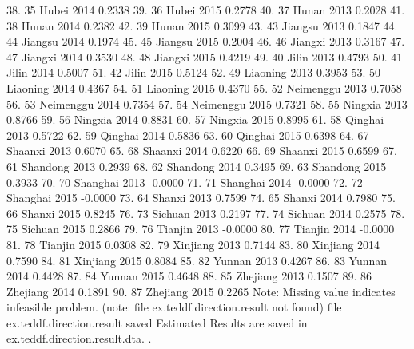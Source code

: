  38. {\VBAR}  35          Hubei   2014    0.2338 {\VBAR}
 39. {\VBAR}  36          Hubei   2015    0.2778 {\VBAR}
 40. {\VBAR}  37          Hunan   2013    0.2028 {\VBAR}
 41. {\VBAR}  38          Hunan   2014    0.2382 {\VBAR}
 42. {\VBAR}  39          Hunan   2015    0.3099 {\VBAR}
 43. {\VBAR}  43        Jiangsu   2013    0.1847 {\VBAR}
 44. {\VBAR}  44        Jiangsu   2014    0.1974 {\VBAR}
 45. {\VBAR}  45        Jiangsu   2015    0.2004 {\VBAR}
 46. {\VBAR}  46        Jiangxi   2013    0.3167 {\VBAR}
 47. {\VBAR}  47        Jiangxi   2014    0.3530 {\VBAR}
 48. {\VBAR}  48        Jiangxi   2015    0.4219 {\VBAR}
 49. {\VBAR}  40          Jilin   2013    0.4793 {\VBAR}
 50. {\VBAR}  41          Jilin   2014    0.5007 {\VBAR}
 51. {\VBAR}  42          Jilin   2015    0.5124 {\VBAR}
 52. {\VBAR}  49       Liaoning   2013    0.3953 {\VBAR}
 53. {\VBAR}  50       Liaoning   2014    0.4367 {\VBAR}
 54. {\VBAR}  51       Liaoning   2015    0.4370 {\VBAR}
 55. {\VBAR}  52      Neimenggu   2013    0.7058 {\VBAR}
 56. {\VBAR}  53      Neimenggu   2014    0.7354 {\VBAR}
 57. {\VBAR}  54      Neimenggu   2015    0.7321 {\VBAR}
 58. {\VBAR}  55        Ningxia   2013    0.8766 {\VBAR}
 59. {\VBAR}  56        Ningxia   2014    0.8831 {\VBAR}
 60. {\VBAR}  57        Ningxia   2015    0.8995 {\VBAR}
 61. {\VBAR}  58        Qinghai   2013    0.5722 {\VBAR}
 62. {\VBAR}  59        Qinghai   2014    0.5836 {\VBAR}
 63. {\VBAR}  60        Qinghai   2015    0.6398 {\VBAR}
 64. {\VBAR}  67        Shaanxi   2013    0.6070 {\VBAR}
 65. {\VBAR}  68        Shaanxi   2014    0.6220 {\VBAR}
 66. {\VBAR}  69        Shaanxi   2015    0.6599 {\VBAR}
 67. {\VBAR}  61       Shandong   2013    0.2939 {\VBAR}
 68. {\VBAR}  62       Shandong   2014    0.3495 {\VBAR}
 69. {\VBAR}  63       Shandong   2015    0.3933 {\VBAR}
 70. {\VBAR}  70       Shanghai   2013   -0.0000 {\VBAR}
 71. {\VBAR}  71       Shanghai   2014   -0.0000 {\VBAR}
 72. {\VBAR}  72       Shanghai   2015   -0.0000 {\VBAR}
 73. {\VBAR}  64         Shanxi   2013    0.7599 {\VBAR}
 74. {\VBAR}  65         Shanxi   2014    0.7980 {\VBAR}
 75. {\VBAR}  66         Shanxi   2015    0.8245 {\VBAR}
 76. {\VBAR}  73        Sichuan   2013    0.2197 {\VBAR}
 77. {\VBAR}  74        Sichuan   2014    0.2575 {\VBAR}
 78. {\VBAR}  75        Sichuan   2015    0.2866 {\VBAR}
 79. {\VBAR}  76        Tianjin   2013   -0.0000 {\VBAR}
 80. {\VBAR}  77        Tianjin   2014   -0.0000 {\VBAR}
 81. {\VBAR}  78        Tianjin   2015    0.0308 {\VBAR}
 82. {\VBAR}  79       Xinjiang   2013    0.7144 {\VBAR}
 83. {\VBAR}  80       Xinjiang   2014    0.7590 {\VBAR}
 84. {\VBAR}  81       Xinjiang   2015    0.8084 {\VBAR}
 85. {\VBAR}  82         Yunnan   2013    0.4267 {\VBAR}
 86. {\VBAR}  83         Yunnan   2014    0.4428 {\VBAR}
 87. {\VBAR}  84         Yunnan   2015    0.4648 {\VBAR}
 88. {\VBAR}  85       Zhejiang   2013    0.1507 {\VBAR}
 89. {\VBAR}  86       Zhejiang   2014    0.1891 {\VBAR}
 90. {\VBAR}  87       Zhejiang   2015    0.2265 {\VBAR}
     {\BLC}
Note: Missing value indicates infeasible problem.
(note: file ex.teddf.direction.result not found)
file ex.teddf.direction.result saved
{\smallskip}
Estimated Results are saved in ex.teddf.direction.result.dta.
{\smallskip}
. 
